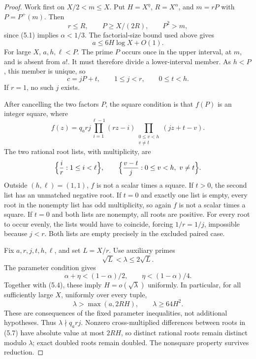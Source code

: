 \documentclass[letterpaper]{article}
\theoremstyle{definition}
\theoremstyle{remark}
\numberwithin{equation}{section}
\begin{document}
\begin{proof}
Work first on $X/2<m\le X$. Put $H=X^\eta$, $R=X^\alpha$, and $m=rP$ with $P=P^+(m)$.
Then
\[
  r\le R,\qquad P\ge X/(2R),\qquad P^2>m,
\]
since (5.1) implies $\alpha<1/3$. The factorial-size bound used above gives
\begin{equation}
  a\le 6H\log X+O(1).
\end{equation}
For large $X$, $a,h,\ell<P$. The prime $P$ occurs once in the upper interval, at $m$, and is absent
from $a!$. It must therefore divide a lower-interval member. As $h<P$, this member is unique, so
\begin{equation}
  c=jP+t,\qquad 1\le j<r,\qquad 0\le t<h.
\end{equation}
If $r=1$, no such $j$ exists.

After cancelling the two factors $P$, the square condition is that $f(P)$ is an integer square,
where
\begin{equation}
  f(z)=q_arj\prod_{i=1}^{\ell-1}(rz-i)\prod_{\substack{0\le v<h\\ v\ne t}}(jz+t-v).
\end{equation}
The two rational root lists, with multiplicity, are
\begin{equation}
  \Bigl\{\frac ir:1\le i<\ell\Bigr\},\qquad \Bigl\{\frac{v-t}{j}:0\le v<h,\ v\ne t\Bigr\}.
\end{equation}
Outside $(h,\ell)=(1,1)$, $f$ is not a scalar times a square. If $t>0$, the second list has an unmatched
negative root. If $t=0$ and exactly one list is empty, every root in the nonempty list has odd
multiplicity, so again $f$ is not a scalar times a square. If $t=0$ and both lists are nonempty,
all roots are positive. For every root to occur evenly, the lists would have to coincide, forcing
$1/r=1/j$, impossible because $j<r$. Both lists are empty precisely in the excluded paired case.

Fix $a,r,j,t,h,\ell$, and set $L=X/r$. Use auxiliary primes
\[
  \sqrt L<\lambda\le 2\sqrt L.
\]
The parameter condition gives
\begin{equation}
  \alpha+\eta<(1-\alpha)/2,\qquad \eta<(1-\alpha)/4.
\end{equation}
Together with (5.4), these imply $H=o(\sqrt\lambda)$ uniformly. In particular, for all sufficiently large $X$,
uniformly over every tuple,
\[
  \lambda>\max(a,2RH),\qquad \lambda\ge 64H^2.
\]
These are consequences of the fixed parameter inequalities, not additional hypotheses. Thus
$\lambda\nmid q_arj$. Nonzero cross-multiplied differences between roots in (5.7) have absolute value at most
$2RH$, so distinct rational roots remain distinct modulo $\lambda$; exact doubled roots remain doubled.
The nonsquare property survives reduction.


\end{proof}
\end{document}
